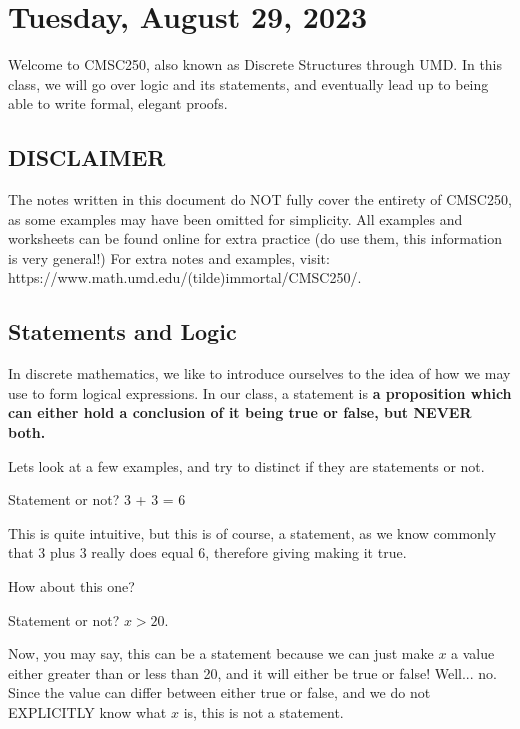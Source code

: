 \section{Tuesday, August 29, 2023}
Welcome to CMSC250, also known as Discrete Structures through UMD. In this class, we will go over logic and its statements, and eventually lead up to being able to write formal, elegant proofs.

\subsection{DISCLAIMER}
The notes written in this document do NOT fully cover the entirety of CMSC250, as some examples may have been omitted for simplicity. All examples and worksheets can be found online for extra practice (do use them, this information is very general!) For extra notes and examples, visit:\\
https://www.math.umd.edu/(tilde)immortal/CMSC250/.

\subsection{Statements and Logic}
In discrete mathematics, we like to introduce ourselves to the idea of how we may use  to form logical expressions. In our class, a statement is \textbf{a proposition which can either hold a conclusion of it being true or false, but NEVER both.}

Lets look at a few examples, and try to distinct if they are statements or not.

\begin{example}
    Statement or not?
    3 + 3 = 6
\end{example}

This is quite intuitive, but this is of course, a statement, as we know commonly that 3 plus 3 really does equal 6, therefore giving making it true.

How about this one?

\begin{example}
    Statement or not?
    \(x > 20\).
\end{example}

Now, you may say, this can be a statement because we can just make \(x\) a value either greater than or less than 20, and it will either be true or false! Well... no. Since the value can differ between either true or false, and we do not EXPLICITLY know what \(x\) is, this is not a statement.

